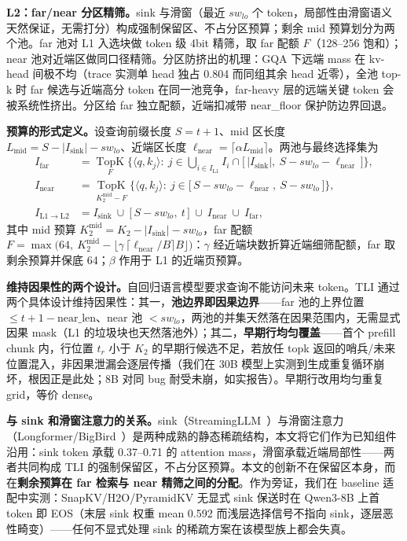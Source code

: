 \documentclass[11pt]{article}
\begin{document}
\textbf{L2：far/near 分区精筛。}sink 与滑窗（最近 $sw_{lo}$ 个 token，局部性由滑窗语义天然保证，无需打分）构成强制保留区、不占分区预算；剩余 mid 预算划分为两个池。far 池对 L1 入选块做 token 级 4bit 精筛，取 far 配额 $F$（128--256 饱和）；near 池对近端区做同口径精筛。分区防挤出的机理：GQA 下远端 mass 在 kv-head 间极不均（trace 实测单 head 独占 0.804 而同组其余 head 近零），全池 top-k 时 far 候选与近端高分 token 在同一池竞争，far-heavy 层的远端关键 token 会被系统性挤出。分区给 far 独立配额，近端扣减带 near\_floor 保护防边界回退。

\textbf{预算的形式定义。}设查询前缀长度 $S=t+1$、mid 区长度 $L_{\mathrm{mid}}=S-|I_{\mathrm{sink}}|-sw_{lo}$、近端区长度 $\ell_{\mathrm{near}}=\lceil\alpha L_{\mathrm{mid}}\rceil$。两池与最终选择集为
\begin{align}
I_{\mathrm{far}} &= \operatorname*{TopK}_{F}\Big\{\langle q,k_j\rangle:\ j\in\bigcup\nolimits_{i\in I_{\mathrm{L1}}} I_i\cap\big[\,|I_{\mathrm{sink}}|,\ S-sw_{lo}-\ell_{\mathrm{near}}\,\big]\Big\},\\
I_{\mathrm{near}} &= \operatorname*{TopK}_{K_2^{\mathrm{mid}}-F}\Big\{\langle q,k_j\rangle:\ j\in\big[\,S-sw_{lo}-\ell_{\mathrm{near}},\ S-sw_{lo}\,\big]\Big\},\\
I_{\mathrm{L1}\rightarrow\mathrm{L2}} &= I_{\mathrm{sink}}\ \cup\ \big[\,S-sw_{lo},\ t\,\big]\ \cup\ I_{\mathrm{near}}\ \cup\ I_{\mathrm{far}},
\end{align}
其中 mid 预算 $K_2^{\mathrm{mid}}=K_2-|I_{\mathrm{sink}}|-sw_{lo}$，far 配额 $F=\max\big(64,\ K_2^{\mathrm{mid}}-\lfloor\gamma\,\lceil\ell_{\mathrm{near}}/B\rceil B\rfloor\big)$：$\gamma$ 经近端块数折算近端细筛配额，far 取剩余预算并保底 64；$\beta$ 作用于 L1 的近端页预算。

\textbf{维持因果性的两个设计。}自回归语言模型要求查询不能访问未来 token。TLI 通过两个具体设计维持因果性：其一，\textbf{池边界即因果边界}——far 池的上界位置 $\leq t+1-\mathrm{near\_len}$、near 池 $< sw_{lo}$，两池的并集天然落在因果范围内，无需显式因果 mask（L1 的垃圾块也天然落池外）；其二，\textbf{早期行均匀覆盖}——首个 prefill chunk 内，行位置 $t_r$ 小于 $K_2$ 的早期行候选不足，若放任 topk 返回的哨兵/未来位置混入，非因果泄漏会逐层传播（我们在 30B 模型上实测到生成重复循环崩坏，根因正是此处；8B 对同 bug 耐受未崩，如实报告）。早期行改用均匀重复 grid，等价 dense。

\textbf{与 sink 和滑窗注意力的关系。}sink（StreamingLLM~\cite{streamingllm}）与滑窗注意力（Longformer/BigBird~\cite{longformer,bigbird}）是两种成熟的静态稀疏结构，本文将它们作为已知组件沿用：sink token 承载 0.37--0.71 的 attention mass，滑窗承载近端局部性——两者共同构成 TLI 的强制保留区，不占分区预算。本文的创新不在保留区本身，而在\textbf{剩余预算在 far 检索与 near 精筛之间的分配}。作为旁证，我们在 baseline 适配中实测：SnapKV/H2O/PyramidKV 无显式 sink 保送时在 Qwen3-8B 上首 token 即 EOS（末层 sink 权重 mean 0.592 而浅层选择信号不指向 sink，逐层恶性畸变）——任何不显式处理 sink 的稀疏方案在该模型族上都会失真。
\end{document}

